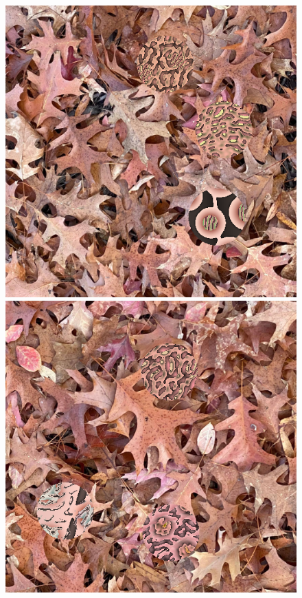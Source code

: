 \documentclass[acmtog]{acmart}
\begin{document}







\begin{figure}
    \includegraphics[scale=0.24]{20221202_1555_step_6460.png}
    \hfill
    \includegraphics[scale=0.24]{20221202_1555_step_6560.png}

\end{figure}
\end{document}

